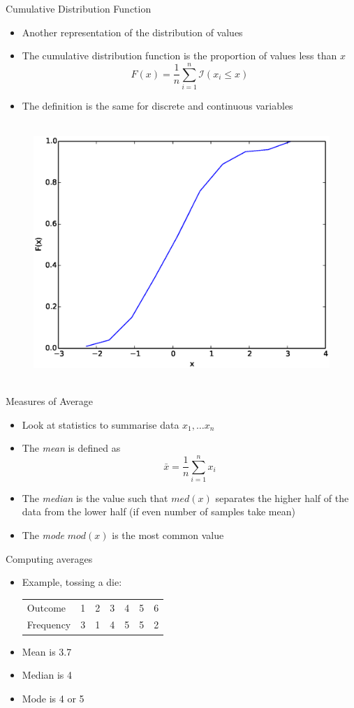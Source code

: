 \documentclass{beamer}
\begin{document}
\begin{frame}{Cumulative Distribution Function}  
\begin{itemize} 
 \item Another representation of the distribution of values 
\item The cumulative distribution function is the proportion of values less than $x$
\begin{displaymath}
 F(x) = \frac{1}{n}\sum_{i=1}^n \mathcal{I}(x_i \leq x)
\end{displaymath}
\item The definition is the same for discrete and continuous variables 
\end{itemize}
 \begin{figure}[htp]
\mbox{
\includegraphics[width=0.5\linewidth]{ContinuousCDF.eps}
}
\end{figure} 
\end{frame}

\begin{frame}{Measures of Average}
\begin{itemize} 
 \item Look at statistics to summarise data $x_1, \ldots x_n$
  \item The \emph{mean} is defined as 
  \begin{displaymath}
   \bar{x} = \frac{1}{n}\sum_{i=1}^n x_i
  \end{displaymath}
\item The \emph{median} is the value such that $med(x)$ separates the higher half of the data from the lower half (if even number of samples take mean) 
\item The \emph{mode} $mod(x)$ is the most common value  
\end{itemize}
\end{frame}

\begin{frame}{Computing averages} 
 \begin{itemize} 
  \item Example, tossing a die: 
\begin{table}
  \begin{tabular}{l | l l l l l l }
\hline 
  Outcome & 1 & 2 & 3 & 4 & 5 & 6 \\ 
  Frequency & 3 & 1 & 4 & 5 & 5 & 2 \\
\hline 
  \end{tabular} 
\end{table}
  \item Mean is 3.7 
  \item Median is 4 
  \item Mode is 4 or 5 
 \end{itemize}
\end{frame}
\end{document}
